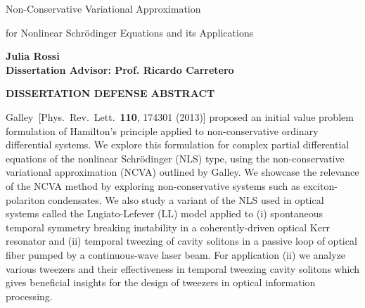 \renewcommand\floatpagefraction{0.9}
\renewcommand{\baselinestretch}{1.}
\topmargin 0.0in
\newcommand{\marg}[1]{\marginpar{\raggedright\scriptsize#1}}
\parskip=10pt
\setlength{\textwidth}{6.5in}
\setlength{\textheight}{8.5in}
\setlength{\evensidemargin}{0.0in}
\setlength{\oddsidemargin}{0.0in}
\renewcommand{\abstractname}{\bf ABSTRACT}



\pagestyle{empty}


\begin{center}
{\large \bf
\centerline{Non-Conservative Variational Approximation}  
\smallskip 
\centerline{for Nonlinear Schr\"{o}dinger Equations and its Applications}
}
\end{center}

\vskip0.3in
\begin{center}
\bf Julia Rossi  \\
Dissertation Advisor: {\bf Prof. Ricardo Carretero} \\
\end{center}

\bigskip
\centerline {{\bf DISSERTATION DEFENSE ABSTRACT}}
\bigskip

\noindent Galley~[Phys.~Rev.~Lett.~{\bf 110}, 174301 (2013)] proposed an initial value problem formulation of Hamilton's principle applied to non-conservative ordinary differential systems.  We explore this formulation for complex partial differential equations of the nonlinear Schr\"{o}dinger (NLS) type, using the non-conservative variational approximation (NCVA) outlined by Galley.  We showcase the relevance of the NCVA method by exploring non-conservative systems such as exciton-polariton condensates.  We also study a variant of the NLS used in optical systems called the Lugiato-Lefever (LL) model applied to (i) spontaneous temporal symmetry breaking instability in a coherently-driven optical Kerr resonator and (ii) temporal tweezing of cavity solitons in a passive loop of optical fiber pumped by a continuous-wave laser beam.  For application (ii) we analyze various tweezers and their effectiveness in temporal tweezing cavity solitons which gives beneficial insights for the design of tweezers in optical information processing.


